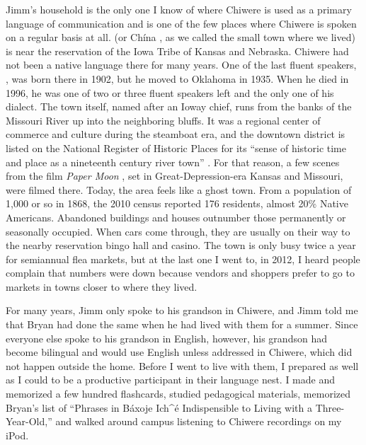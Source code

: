 \documentclass[output=paper]{LSP/langsci}
\begin{document}
Jimm's household is the only one I know of where Chiwere is used as a primary language of communication and is one of the few places where Chiwere is spoken on a regular basis at all.  (or Ch\'ina , as we called the small town where we lived) is near the reservation of the Iowa Tribe of Kansas and Nebraska. Chiwere had not been a native language there for many years. One of the last fluent speakers, , was born there in 1902, but he moved to Oklahoma in 1935. When he died in 1996, he was one of two or three fluent speakers left and the only one of his dialect. The town itself, named after an Ioway chief, runs from the banks of the Missouri River up into the neighboring bluffs. It was a regional center of commerce and culture during the steamboat era, and the downtown district is listed on the National Register of Historic Places for its ``sense of historic time and place as a nineteenth century river town'' \citep[1]{Wolfenbarger1996}. For that reason, a few scenes from the film \emph{Paper Moon} \citep{Bogdanovich1973}, set in Great-Depression-era Kansas and Missouri, were filmed there. Today, the area feels like a ghost town. From a population of 1,000 or so in 1868, the 2010 census reported 176 residents, almost 20\% Native Americans. Abandoned buildings and houses outnumber those permanently or seasonally occupied. When cars come through, they are usually on their way to the nearby reservation bingo hall and casino. The town is only busy twice a year for semiannual flea markets, but at the last one I went to, in 2012, I heard people complain that numbers were down because vendors and shoppers prefer to go to markets in towns closer to where they lived.

For many years, Jimm only spoke to his grandson in Chiwere, and Jimm told me that Bryan had done the same when he had lived with them for a summer. Since everyone else spoke to his grandson in English, however, his grandson had become bilingual and would use English unless addressed in Chiwere, which did not happen outside the home. Before I went to live with them, I prepared as well as I could to be a productive participant in their language nest. I made and memorized a few hundred flashcards, studied pedagogical materials, memorized Bryan's list of ``Phrases in B\'axoje Ich\^{ }\'e Indispensible to Living with a Three-Year-Old,'' and walked around campus listening to Chiwere recordings on my iPod.
\end{document}
